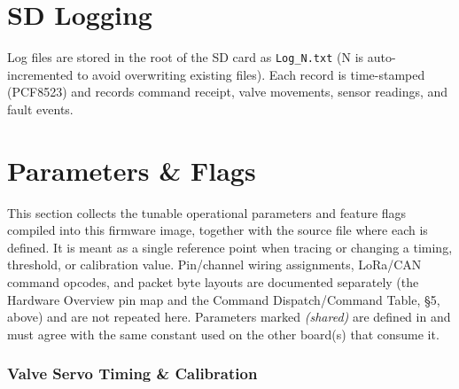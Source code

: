﻿\documentclass[11pt,letterpaper]{article}
\begin{document}
\section{SD Logging}

Log files are stored in the root of the SD card as \texttt{Log\_N.txt}
(N is auto-incremented to avoid overwriting existing files).
Each record is time-stamped (PCF8523) and records command receipt, valve
movements, sensor readings, and fault events.

\section{Parameters \& Flags}

This section collects the tunable operational parameters and feature flags
compiled into this firmware image, together with the source file where each
is defined. It is meant as a single reference point when tracing or changing
a timing, threshold, or calibration value. Pin/channel wiring assignments,
LoRa/CAN command opcodes, and packet byte layouts are documented separately
(the Hardware Overview pin map and the Command Dispatch/Command Table, §5, above) and are
not repeated here. Parameters marked \emph{(shared)} are defined in
 and must agree with the same constant used on
the other board(s) that consume it.

\subsubsection*{Valve Servo Timing \& Calibration}
\end{document}

